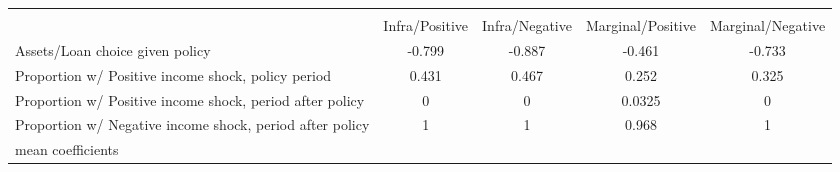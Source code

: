 \begin{tabular}{l*{4}{c}}
\hline\hline
                    &\multicolumn{4}{c}{}                               \\
                    &Infra/Positive&Infra/Negative&Marginal/Positive&Marginal/Negative\\
\hline
Assets/Loan choice given policy&      -0.799&      -0.887&      -0.461&      -0.733\\
Proportion w/ Positive income shock, policy period&       0.431&       0.467&       0.252&       0.325\\
Proportion w/ Positive income shock, period after policy&           0&           0&      0.0325&           0\\
Proportion w/ Negative income shock, period after policy&           1&           1&       0.968&           1\\
\hline\hline
\multicolumn{5}{l}{\footnotesize mean coefficients}\\
\end{tabular}
